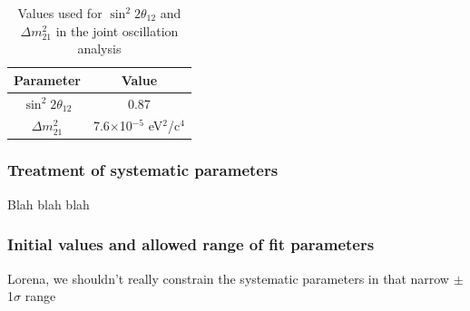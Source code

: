 \begin{table}[h]
\centering
\begin{tabular}{|c|c|}
\hline
Parameter & Value \\
\hline
\hline
$\sin^{2}2\theta_{12}$ & 0.87 \\
\hline 
$\Delta m_{21}^{2}$ & 7.6$\times$10$^{-5}$ eV$^{2}$/c$^{4}$ \\
\hline
\end{tabular}
\caption{Values used for $\sin^{2}2\theta_{12}$ and $\Delta m_{21}^{2}$ in the joint oscillation analysis}
\label{tab:solarparameters}
\end{table}

\subsubsection{Treatment of systematic parameters}

{\color{red} Blah blah blah}


\subsubsection{Initial values and allowed range of fit parameters}
\label{sec:initvalues_range}

{\color{red} Lorena, we shouldn't really constrain the systematic parameters in that narrow $\pm$1$\sigma$ range}

